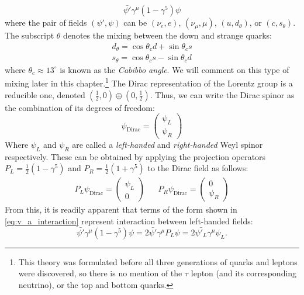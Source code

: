 \begin{equation}\label{eq:v_a_interaction}
\bar{\psi'}\gamma^\mu(1-\gamma^5)\psi
\end{equation}
where the pair of fields $(\psi', \psi)$ can be $(\nu_e, e)$, $(\nu_\mu,\mu)$, $(u, d_\theta)$, or $(c, s_\theta)$. The subscript $\theta$ denotes the mixing between the down and strange quarks: 
  \begin{equation}
    \begin{split}
    d_\theta = \cos\theta_c d + \sin\theta_c s\\
    s_\theta = \cos\theta_c s - \sin\theta_c d
  \end{split}
  \end{equation}
  where $\theta_c \approx 13^\circ$ is known as the \emph{Cabibbo angle}. We will comment on this type of mixing later in this chapter.\footnote{This theory was formulated before all three generations of quarks and leptons were discovered, so there is no mention of the $\tau$ lepton (and its corresponding neutrino), or the top and bottom quarks.}
  The Dirac representation of the Lorentz group is a reducible one, denoted $\left(\frac{1}{2},0\right)\oplus\left(0,\frac{1}{2}\right)$. Thus, we can write the Dirac spinor as the combination of its degrees of freedom:
\begin{equation}
  \psi_\text{Dirac} = \begin{pmatrix}\psi_L\\\psi_R\end{pmatrix} 
\end{equation}
Where $\psi_L$ and $\psi_R$ are called a \emph{left-handed} and \emph{right-handed} Weyl spinor respectively. These can be obtained by applying the projection operators $P_L = \frac{1}{2}(1-\gamma^5)$ and $P_R = \frac{1}{2}(1+\gamma^5)$  
to the Dirac field as follows:
\begin{align}
  P_L\psi_\text{Dirac} =
 \begin{pmatrix}
    \psi_L\\0
  \end{pmatrix}
  && 
  P_R\psi_\text{Dirac} = 
  \begin{pmatrix}
    0\\\psi_R
  \end{pmatrix}
\end{align}
From this, it is readily apparent that terms of the form shown in \autoref{eq:v_a_interaction} represent interaction between left-handed fields:
\begin{equation}
\bar{\psi'}\gamma^\mu(1-\gamma^5)\psi = 2\bar{\psi'}\gamma^\mu P_L\psi = 2\bar{\psi'_L}\gamma^\mu\psi _L.
\end{equation}
